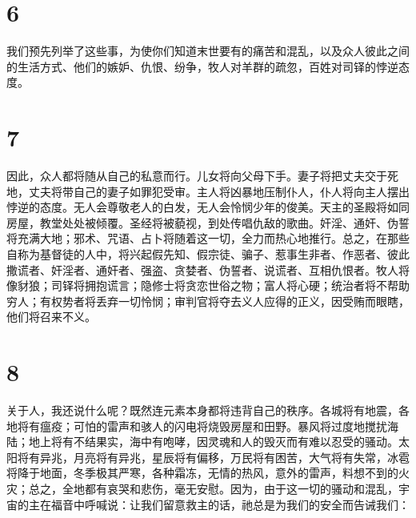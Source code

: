 
\section{6}

我们预先列举了这些事，为使你们知道末世要有的痛苦和混乱，以及众人彼此之间的生活方式、他们的嫉妒、仇恨、纷争，牧人对羊群的疏忽，百姓对司铎的悖逆态度。\par


\section{7}

因此，众人都将随从自己的私意而行。儿女将向父母下手。妻子将把丈夫交于死地，丈夫将带自己的妻子如罪犯受审。主人将凶暴地压制仆人，仆人将向主人摆出悖逆的态度。无人会尊敬老人的白发，无人会怜悯少年的俊美。天主的圣殿将如同房屋，教堂处处被倾覆。圣经将被藐视，到处传唱仇敌的歌曲。奸淫、通奸、伪誓将充满大地；邪术、咒语、占卜将随着这一切，全力而热心地推行。总之，在那些自称为基督徒的人中，将兴起假先知、假宗徒、骗子、惹事生非者、作恶者、彼此撒谎者、奸淫者、通奸者、强盗、贪婪者、伪誓者、说谎者、互相仇恨者。牧人将像豺狼；司铎将拥抱谎言；隐修士将贪恋世俗之物；富人将心硬；统治者将不帮助穷人；有权势者将丢弃一切怜悯；审判官将夺去义人应得的正义，因受贿而眼瞎，他们将召来不义。\par


\section{8}

关于人，我还说什么呢？既然连元素本身都将违背自己的秩序。各城将有地震，各地将有瘟疫；可怕的雷声和骇人的闪电将烧毁房屋和田野。暴风将过度地搅扰海陆；地上将有不结果实，海中有咆哮，因灵魂和人的毁灭而有难以忍受的骚动。太阳将有异兆，月亮将有异兆，星辰将有偏移，万民将有困苦，大气将有失常，冰雹将降于地面，冬季极其严寒，各种霜冻，无情的热风，意外的雷声，料想不到的火灾；总之，全地都有哀哭和悲伤，毫无安慰。因为，由于这一切的骚动和混乱，宇宙的主在福音中呼喊说：让我们留意救主的话，祂总是为我们的安全而告诫我们：\par

